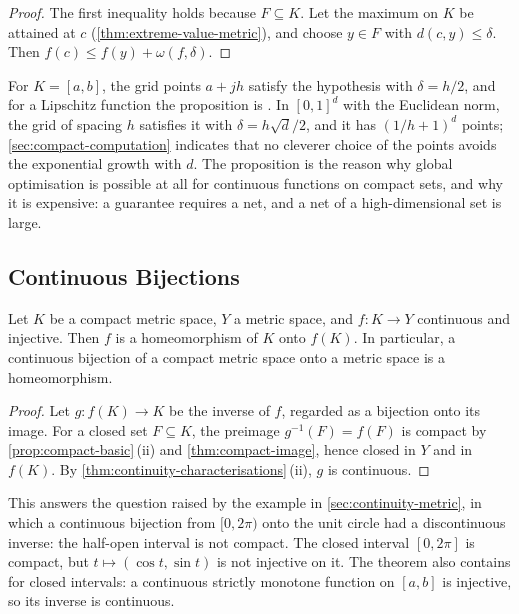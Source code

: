 \begin{proof}
The first inequality holds because $F\subseteq K$. Let the maximum on $K$ be attained at $c$ (\cref{thm:extreme-value-metric}), and choose $y\in F$ with $d(c,y)\le\delta$. Then $f(c)\le f(y)+\omega(f,\delta)$.
\end{proof}

For $K=[a,b]$, the grid points $a+jh$ satisfy the hypothesis with $\delta=h/2$, and for a Lipschitz function the proposition is . In $[0,1]^d$ with the Euclidean norm, the grid of spacing $h$ satisfies it with $\delta=h\sqrt d/2$, and it has $(1/h+1)^d$ points; \cref{sec:compact-computation} indicates that no cleverer choice of the points avoids the exponential growth with $d$. The proposition is the reason why global optimisation is possible at all for continuous functions on compact sets, and why it is expensive: a guarantee requires a net, and a net of a high-dimensional set is large.

\subsection{Continuous Bijections}

\begin{theorem}
\label{thm:compact-homeomorphism}
Let $K$ be a compact metric space, $Y$ a metric space, and $f\colon K\to Y$ continuous and injective. Then $f$ is a homeomorphism of $K$ onto $f(K)$. In particular, a continuous bijection of a compact metric space onto a metric space is a homeomorphism.
\end{theorem}

\begin{proof}
Let $g\colon f(K)\to K$ be the inverse of $f$, regarded as a bijection onto its image. For a closed set $F\subseteq K$, the preimage $g^{-1}(F)=f(F)$ is compact by \cref{prop:compact-basic}\,(ii) and \cref{thm:compact-image}, hence closed in $Y$ and in $f(K)$. By \cref{thm:continuity-characterisations}\,(ii), $g$ is continuous.
\end{proof}

This answers the question raised by the example in \cref{sec:continuity-metric}, in which a continuous bijection from $[0,2\pi)$ onto the unit circle had a discontinuous inverse: the half-open interval is not compact. The closed interval $[0,2\pi]$ is compact, but $t\mapsto(\cos t,\sin t)$ is not injective on it. The theorem also contains  for closed intervals: a continuous strictly monotone function on $[a,b]$ is injective, so its inverse is continuous.

